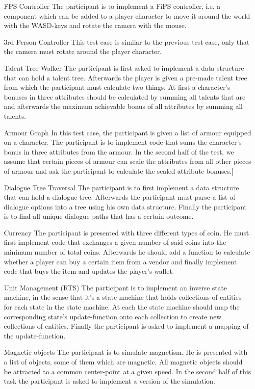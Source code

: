 \begin{labeling}{\quad\quad}
    \item[FPS Controller] The participant is to implement a \gls{FiPS} controller, i.e. a component which can be added to a player character to move it around the world with the WASD-keys and rotate the camera with the mouse.
    \item[3rd Person Controller] This test case is similar to the previous test case, only that the camera must rotate around the player character.
    \item[Talent Tree-Walker] The participant is first asked to implement a data structure that can hold a talent tree. Afterwards the player is given a pre-made talent tree from which the participant must calculate two things. At first a character's bonuses in three attributes should be calculated by summing all talents that are  and afterwards the maximum achievable bonus of all attributes by summing all talents.
    \item[Armour Graph] In this test case, the participant is given a list of armour equipped on a character. The participant is to implement code that sums the character's bonus in three attributes from the armour. In the second half of the test, we assume that certain pieces of armour can scale the attributes from all other pieces of armour and ask the participant to calculate the scaled attribute bonuses.]
    \item[Dialogue Tree Traversal] The participant is to first implement a data structure that can hold a dialogue tree. Afterwards the participant must parse a list of dialogue options into a tree using his own data structure. Finally the participant is to find all unique dialogue paths that has a certain outcome.
    \item[Currency] The participant is presented with three different types of coin. He must first implement code that exchanges a given number of said coins into the minimum number of total coins. Afterwards he should add a function to calculate whether a player can buy a certain item from a vendor and finally implement code that buys the item and updates the player's wallet.
    \item[Unit Management (RTS)] The participant is to implement an inverse state machine, in the sense that it's a state machine that holds collections of entities for each state in the state machine. At each  the state machine should map the corresponding state's update-function onto each collection to create new collections of entities. Finally the participant is asked to implement a  mapping of the update-function.
    \item[Magnetic objects] The participant is to simulate magnetism. He is presented with a list of objects, some of them which are magnetic. All magnetic objects should be attracted to a common center-point at a given speed. In the second half of this task the participant is asked to implement a  version of the simulation.
\end{labeling}

